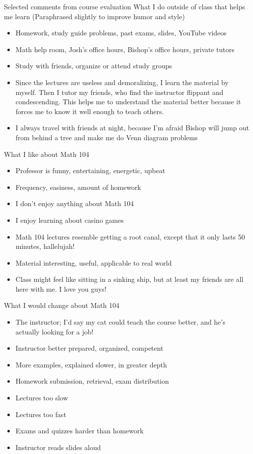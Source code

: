 \documentclass[handout]{beamer}
\theoremstyle{definition}
\begin{document}
\begin{frame}{Selected comments from course evaluation}
What I do outside of class that helps me learn
(Paraphrased slightly to improve humor and style)
\begin{itemize}
\item Homework, study guide problems, past exams, slides,
YouTube videos
\item Math help room, Josh's office hours, Bishop's office hours,
private tutors
\item Study with friends, organize or attend study groups
\item Since the lectures are useless and demoralizing, I learn the
material by myself. Then I tutor my friends, who
find the instructor flippant and condescending.
This helps me to understand the material better because
it forces me to know it well enough to teach others.
\item I always travel with friends at night, because I'm afraid
Bishop will jump out from behind a tree and make me do Venn diagram
problems
\end{itemize}
\end{frame}

\begin{frame}
What I like about Math 104
\begin{itemize}
\item Professor is funny, entertaining, energetic, upbeat
\item Frequency, easiness, amount of homework
\item I don't enjoy anything about Math 104
\item I enjoy learning about casino games
\item Math 104 lectures resemble
getting a root canal, except that it only lasts 50 minutes, hallelujah!
\item Material interesting, useful, applicable to real world
\item Class might feel like sitting in a sinking ship,
but at least my friends are all here with me. I love you guys!
\end{itemize}
\end{frame}

\begin{frame}
What I would change about Math 104
\begin{itemize}
\item The instructor; I'd say my cat could teach the
course better, and he's actually looking for a job!
\item Instructor better prepared, organized, competent
\item More examples, explained slower, in greater depth
\item Homework submission, retrieval, exam distribution
\item Lectures too slow
\item Lectures too fast
\item Exams and quizzes harder than homework
\item Instructor reads slides aloud
\end{itemize}
\end{frame}
\end{document}
